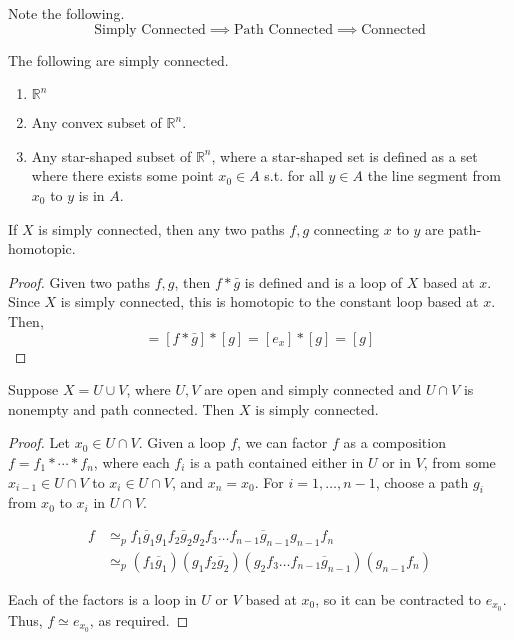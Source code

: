   Note the following. 
  \begin{equation}
    \text{Simply Connected} \implies \text{Path Connected} \implies \text{Connected}
  \end{equation}

  \begin{example}
    The following are simply connected. 
    \begin{enumerate}
      \item $\mathbb{R}^n$ 
      \item Any convex subset of $\mathbb{R}^n$.
      \item Any star-shaped subset of $\mathbb{R}^n$, where a star-shaped set is defined as a set where there exists some point $x_0 \in A$ s.t. for all $y \in A$ the line segment from $x_0$ to $y$ is in $A$.  
    \end{enumerate}
  \end{example}

  \begin{lemma}
    If $X$ is simply connected, then any two paths $f, g$ connecting $x$ to $y$ are path-homotopic. 
  \end{lemma}
  \begin{proof}
    Given two paths $f, g$, then $f \ast \bar{g}$ is defined and is a loop of $X$ based at $x$. Since $X$ is simply connected, this is homotopic to the constant loop based at $x$. Then, 
    \begin{equation}
      [f] = [f \ast \bar{g}] \ast [g] = [e_x] \ast [g] = [g]
    \end{equation}
  \end{proof}

  \begin{theorem}
    Suppose $X = U \cup V$, where $U, V$ are open and simply connected and $U \cap V$ is nonempty and path connected. Then $X$ is simply connected. 
  \end{theorem}
  \begin{proof}
    Let $x_0 \in U \cap V$. Given a loop $f$, we can factor $f$ as a composition $f = f_1 * \cdots * f_n$, where each $f_i$ is a path contained either in $U$ or in $V$, from some $x_{i-1} \in U \cap V$ to $x_i \in U \cap V$, and $x_n = x_0$. For $i = 1, \ldots, n-1$, choose a path $g_i$ from $x_0$ to $x_i$ in $U \cap V$.

    \begin{align}
      f &\simeq_p f_1 \overline{g}_1 g_1 f_2 \overline{g}_2 g_2 f_3 \ldots f_{n-1} \overline{g}_{n-1} g_{n-1} f_n\\
      &\simeq_p (f_1 \overline{g}_1)(g_1 f_2 \overline{g}_2)(g_2 f_3 \ldots f_{n-1} \overline{g}_{n-1})(g_{n-1} f_n)
    \end{align}

    Each of the factors is a loop in $U$ or $V$ based at $x_0$, so it can be contracted to $e_{x_0}$. Thus, $f \simeq e_{x_0}$, as required.
  \end{proof}

